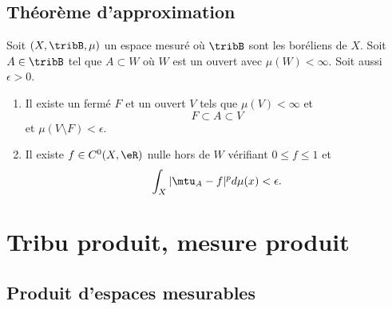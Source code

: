 \subsection{Théorème d'approximation}

\begin{theorem}     \label{ThoAFXXcVa}
    Soit \( (X,\tribB,\mu)\) un espace mesuré où \( \tribB\) sont les boréliens de \( X\). Soit \( A\in \tribB\) tel que \( A\subset W\) où \( W\) est un ouvert avec \( \mu(W)<\infty\). Soit aussi \( \epsilon>0\).
    \begin{enumerate}
        \item
            Il existe un fermé \( F\) et un ouvert \( V\) tels que \( \mu(V)<\infty\) et
            \begin{equation}
                F\subset A\subset V
            \end{equation}
            et \( \mu(V\setminus F)<\epsilon\).
        \item
            Il existe \( f\in C^0(X,\eR)\) nulle hors de \( W\) vérifiant \( 0\leq f\leq 1\) et
            \begin{equation}
                \int_X| \mtu_A-f |^pd\mu(x)<\epsilon.
            \end{equation}
    \end{enumerate}
\end{theorem}

\section{Tribu produit, mesure produit}

\subsection{Produit d'espaces mesurables}

